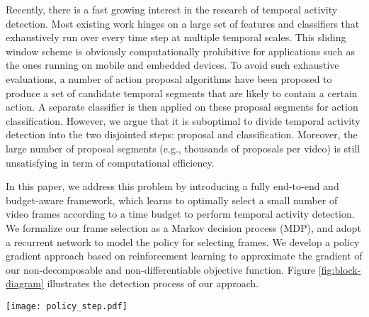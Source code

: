 \documentclass{bmvc2k}
\begin{document}
Recently, there is a fast growing interest in the research of temporal activity detection. Most existing work \cite{upc, oneata2014lear, singh2016untrimmed, wang2014action, score-pyramid} hinges on a large set of features and classifiers that exhaustively run over every time step at multiple temporal scales. This sliding window scheme is obviously computationally prohibitive for applications such as the ones running on mobile and embedded devices. To avoid such exhaustive evaluations, a number of action proposal algorithms \cite{daps, fast-proposal, shou2016temporal} have been proposed to produce a set of candidate temporal segments that are likely to contain a certain action. A separate classifier is then applied on these proposal segments for action classification. However, we argue that it is suboptimal to divide temporal activity detection into the two disjointed steps: proposal and classification. Moreover, the large number of proposal segments (e.g., thousands of proposals per video) is still unsatisfying in term of computational efficiency.   

In this paper, we address this problem by introducing a fully end-to-end and budget-aware framework, which learns to optimally select a small number of video frames according to a time budget to perform temporal activity detection. We formalize our frame selection as a Markov decision process (MDP), and adopt a recurrent network to model the policy for selecting frames. We develop a policy gradient approach based on reinforcement learning to approximate the gradient of our non-decomposable and non-differentiable objective function. Figure \ref{fig:block-diagram} illustrates the detection process of our approach.

\begin{figure*}%
	\centering
	\texttt{[image: policy\_step.pdf]}
	\caption {Given an untrimmed long video, at each step $t$ the policy has access to the local observation $o_t$ of a neighborhood centered around the current selected frame at $\xi_t$. For each step, the policy predicts a segment $m_t$ and produces three outputs: the temporal location $l_t$ (i.e., start and end) of the segment, the estimated class $c_t$ of the segment, and the next frame to observe at $\xi_{t + 1}$. The policy runs for $T$ steps according to a specified time budget.}
	\label{fig:block-diagram}
\end{figure*}    
\end{document}
